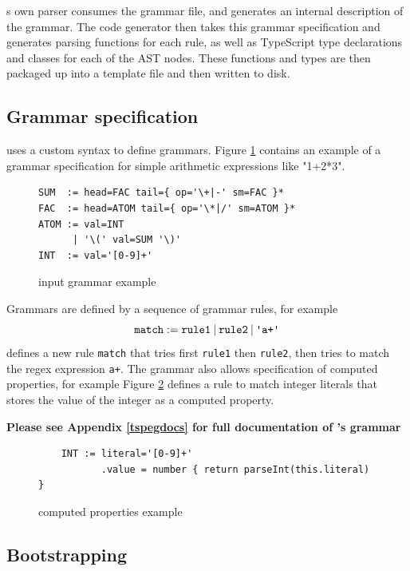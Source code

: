 \tsPEG{}s own parser consumes the grammar file, and generates an internal description of the grammar. The code generator then takes this grammar specification and generates parsing functions for each rule, as well as TypeScript type declarations and classes for each of the AST nodes. These functions and types are then packaged up into a template file and then written to disk.

\subsection{Grammar specification}

\tsPEG{} uses a custom syntax to define grammars. Figure \ref{tspegexample} contains an example of a grammar specification for simple arithmetic expressions like "1+2*3".

\begin{figure}
    \caption{\tsPEG{} input grammar example}
    \label{tspegexample}
    \begin{lstlisting}
SUM  := head=FAC tail={ op='\+|-' sm=FAC }*
FAC  := head=ATOM tail={ op='\*|/' sm=ATOM }*
ATOM := val=INT
      | '\(' val=SUM '\)'
INT  := val='[0-9]+'
    \end{lstlisting}
\end{figure}

Grammars are defined by a sequence of grammar rules, for example
    \[\texttt{match} := \texttt{rule1} \mathbin{|} \texttt{rule2} \mathbin{|} \texttt{\textquotesingle a+\textquotesingle}\]
    defines a new rule \verb|match| that tries first \verb|rule1| then \verb|rule2|, then tries to match the regex expression \verb|a+|.
    The \tsPEG{} grammar also allows specification of computed properties, for example Figure \ref{tspegcomputed} defines a rule to match integer literals that stores the value of the integer as a computed property.

   \textbf{Please see Appendix \ref{tspegdocs} for full documentation of \tsPEG{}'s grammar} 
\begin{figure}
    \caption{\tsPEG{} computed properties example}
    \label{tspegcomputed}
    \begin{lstlisting}
    INT := literal='[0-9]+'
           .value = number { return parseInt(this.literal) }
    \end{lstlisting}
\end{figure}

\subsection{Bootstrapping}

